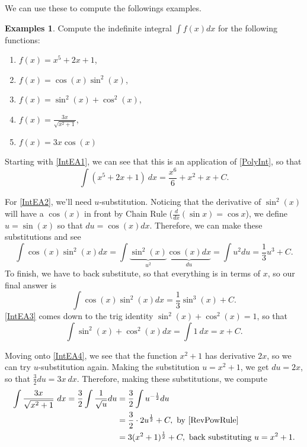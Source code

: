 \documentclass[12pt]{article}
\newcommand{\diff}[2]{\frac{d #1}{d #2} }
\theoremstyle{definition}
\newtheorem{exmps}[thm]{Examples}
\theoremstyle{plain}
\numberwithin{equation}{section}
\begin{document}
We can use these to compute the followings examples. %
\begin{exmps}

Compute the indefinite integral $\int f(x)dx$ for the following functions:
\begin{enumerate}[label=\textbf{Example A.\arabic*.}]
  \addtolength{\itemindent}{1.625cm} %
  \item \label{IntEA1} $f(x)=x^5+2x+1$, %
  \item \label{IntEA2} $f(x)=\cos(x)\sin^2(x)$, %
  \item \label{IntEA3} $f(x)= \sin^2(x)+\cos^2(x)$, %
  \item \label{IntEA4} $f(x)=\frac{3x}{\sqrt{x^2+1}}$, %
  \item \label{IntEA5} $f(x)= 3x\cos(x)$ %
\end{enumerate}

Starting with \ref{IntEA1}, we can see that this is an application of \cref{PolyInt}, so that
\[
\int (x^5+2x+1)\ dx=\frac{x^6}{6}+x^2+x+C.
\]

For \ref{IntEA2}, we'll need $u$-substitution. Noticing that the derivative of $\sin^2(x)$ will have a $\cos(x)$ in front by Chain Rule ($\diff{}{x}(\sin x)=\cos x$), we define $u=\sin(x)$ so that $du=\cos(x)dx$. Therefore, we can make these substitutions and see
\[
\int \cos(x)\sin^2(x)dx=\int \underbrace{\sin^2(x)}_{u^2}\underbrace{\cos(x)dx}_{du}=\int u^2du= \frac{1}{3}u^3+C.
\]
To finish, we have to back substitute, so that everything is in terms of $x$, so our final answer is
\[
\int \cos(x)\sin^2(x)dx=\frac{1}{3}\sin^3(x)+C.
\]
\ref{IntEA3} comes down to the trig identity $\sin^2(x)+\cos^2(x)=1$, so that
\[
\int \sin^2(x)+\cos^2(x) dx= \int 1\ dx= x+C.
\]

Moving onto \ref{IntEA4}, we see that the function $x^2+1$ has derivative $2x$, so we can try $u$-substitution again. Making the substitution $u=x^2+1$, we get $du=2x$, so that $\frac{3}{2}du=3x\ dx$. Therefore, making these substitutions, we compute
\begin{align}
  \int \frac{3x}{\sqrt{x^2+1}}\ dx=\frac{3}{2}\int\frac{1}{\sqrt{u}}du& =\frac{3}{2}\int u^{-\frac{1}{2}}du\\
  &= \frac{3}{2}\cdot2u^{\frac{1}{2}}+C, \text{ by \cref{RevPowRule}}\\
  &= 3(x^2+1)^{\frac{1}{2}}+C, \text{ back substituting }u=x^2+1.
\end{align}


\end{exmps}
\end{document}
